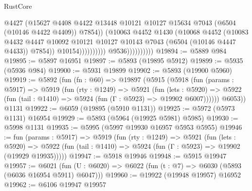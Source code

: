 \begin{lexlean}{RustCore}
\begin{coremodule}
                                            @4427
                                            (@15627
                                              @4408
                                              @4422
                                              @13448
                                              @10121
                                              @10127
                                              @15634
                                              @7043
                                              (@6504 (@10146 @4422 @4409))
                                              @7854))
                                          (@10063
                                            @4452
                                            @1430
                                            (@10068
                                              @4452
                                              (@10083
                                                @4432
                                                @4447
                                                @10092
                                                @10121
                                                @10127
                                                @10143
                                                @7043
                                                (@6504 (@10146 @4447 @4433))
                                                @7854))
                                            @10154))))))))))
                        @9536))))))))))
@19894 := @5889 @984
@19895 := @5897 @16951
@19897 := @5893 (@19895 @5912)
@19899 := @5935 (@5936 @984)
@19900 := @5931 @19899
@19902 := @5893 (@19900 @5960)
@19919 := @5892
    (fun (fn : @60) =>
    @19897
      (@5915
        (@5918
          (fun (params : @5917) =>
          @5919
            (fun (rty : @1249) =>
            @5921
              (fun (lets : @5920) =>
              @5922 (fun (tail : @1410) => @5924 (fun (Γ : @5923) => @19902 @6007))))))
        @6053))
    @1131
@19922 := @6059 (@19895 (@5910 @1131))
@19925 := @5972 (@5973 @1131) @16954
@19929 := @5893 (@5964 (@19925 @5981) @5985)
@19930 := @5998 @1131
@19935 := @5995 (@5997 @19930 @16957 @5953 @5955)
@19946 := fun (params : @5917) =>
  @5919
    (fun (rty : @1249) =>
    @5921
      (fun (lets : @5920) =>
      @5922 (fun (tail : @1410) => @5924 (fun (Γ : @5923) => @19902 (@19929 @19935)))))
@19947 := @5918 @19946
@19948 := @5915 @19947
@19957 := @6021
    (fun (U : @6020) => @6022 (fun (t : @7) => @6030 (@5893 (@6036 @16954 @5911) @6047)))
@19960 := @19922 (@19948 @19957) @16952
@19962 := @6106 @19947 @19957

\end{coremodule}
\end{lexlean}
